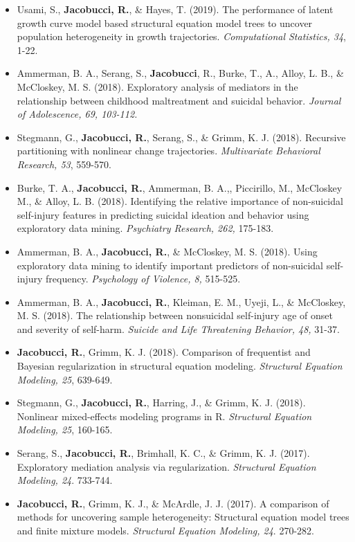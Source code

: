 \documentclass[letterpaper,10pt]{article}
\begin{document}
\begin{itemize}
%
\item[] Usami, S., \textbf{Jacobucci, R.}, \& Hayes, T. (2019). The performance of latent growth curve model based structural equation model trees to uncover population heterogeneity in growth trajectories. \emph{Computational Statistics, 34}, 1-22.
%
\item[]Ammerman, B. A., Serang, S., \textbf{Jacobucci}, R., Burke, T., A., Alloy, L. B., \& McCloskey, M. S. (2018). Exploratory analysis of mediators in the relationship between childhood maltreatment and suicidal behavior. \emph{Journal of Adolescence, 69, 103-112.}
%
\item[]Stegmann, G., \textbf{Jacobucci, R.}, Serang, S., \& Grimm, K. J. (2018). Recursive partitioning with nonlinear change trajectories. \emph{Multivariate Behavioral Research, 53}, 559-570.
%
\item[]Burke, T. A., \textbf{Jacobucci, R.}, Ammerman, B. A.,, Piccirillo, M., McCloskey M., \& Alloy, L. B. (2018). Identifying the relative importance of non-suicidal self-injury features in predicting suicidal ideation and behavior using exploratory data mining. \emph{Psychiatry Research, 262,} 175-183.
%
\item[]Ammerman, B. A., \textbf{Jacobucci, R.}, \& McCloskey, M. S. (2018). Using exploratory data mining to identify important predictors of non-suicidal self-injury frequency. \emph{Psychology of Violence, 8,} 515-525.
%
\item[]Ammerman, B. A., \textbf{Jacobucci, R.}, Kleiman, E. M., Uyeji, L., \& McCloskey, M. S. (2018). The relationship between nonsuicidal self-injury age of onset and severity of self-harm. \emph{Suicide and Life Threatening Behavior, 48,} 31-37.
%
\item[] \textbf{Jacobucci, R.}, Grimm, K. J. (2018). Comparison of frequentist and Bayesian regularization in structural equation modeling. \emph{Structural Equation Modeling, 25}, 639-649.
%
\item[]Stegmann, G., \textbf{Jacobucci, R.}, Harring, J., \& Grimm, K. J. (2018). Nonlinear mixed-effects modeling programs in R. \emph{Structural Equation Modeling, 25}, 160-165.
%
\item[]Serang, S., \textbf{Jacobucci, R.}, Brimhall, K. C., \& Grimm, K. J. (2017). Exploratory mediation analysis via regularization. \emph{Structural Equation Modeling, 24}. 733-744.
%
\item[]\textbf{Jacobucci, R.}, Grimm, K. J., \& McArdle, J. J. (2017). A comparison of methods for uncovering sample heterogeneity: Structural equation model trees and finite mixture models. \emph{Structural Equation Modeling, 24}. 270-282.

\end{itemize}
\end{document}
